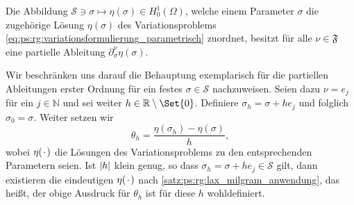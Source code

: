 \begin{Satz}
\label{satz:ps:rg:existenz_partieller_ableitungen}
    Die Abbildung $\mathcal S \ni \sigma \mapsto \eta(\sigma) \in H^{1}_{0}(\Omega)$, welche einem Parameter $\sigma$ die zugehörige Lösung $\eta(\sigma)$ des Variationsproblems \cref{eq:ps:rg:variationsformulierung_parametrisch} zuordnet, besitzt für alle $\nu \in \mathfrak F$ eine partielle Ableitung $\partial^{\nu}_{\sigma} \eta(\sigma)$.

    \begin{Beweis}
        Wir beschränken uns darauf die Behauptung exemplarisch für die partiellen Ableitungen erster Ordnung für ein festes $\sigma \in \mathcal S$ nachzuweisen.
        Seien dazu $\nu = e_{j}$ für ein $j \in \mathbb{N}$ und sei weiter $h \in \mathbb{R} \setminus \Set{ 0 }$.
        Definiere $\sigma_{h} = \sigma + h e_{j}$ und folglich $\sigma_{0} = \sigma$.
        Weiter setzen wir
        \begin{equation}
            \theta_{h} = \frac{\eta(\sigma_{h}) - \eta(\sigma)}{h},
        \end{equation}
        wobei $\eta({\mkern2mu\cdot\mkern2mu})$ die Lösungen des Variationsproblems zu den entsprechenden Parametern seien.
        Ist $\lvert h\rvert$ klein genug, so dass $\sigma_{h} = \sigma + h e_{j} \in \mathcal S$ gilt, dann existieren die eindeutigen $\eta({\mkern2mu\cdot\mkern2mu})$ nach \cref{satz:ps:rg:lax_milgram_anwendung}, das heißt, der obige Ausdruck für $\theta_{h}$ ist für diese $h$ wohldefiniert.


\end{Beweis}
\end{Satz}

